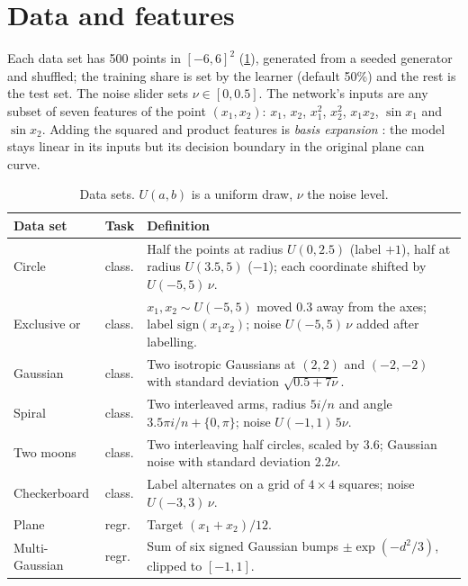 \documentclass[11pt,a4paper]{article}
\begin{document}
\section{Data and features}\label{sec:data}

Each data set has 500 points in $[-6, 6]^2$ (\cref{tab:data}), generated from a seeded generator and shuffled; the training share is set by the learner (default 50\%) and the rest is the test set. The noise slider sets $\nu \in [0, 0.5]$. The network's inputs are any subset of seven features of the point $(x_1, x_2)$: $x_1$, $x_2$, $x_1^2$, $x_2^2$, $x_1x_2$, $\sin x_1$ and $\sin x_2$. Adding the squared and product features is \emph{basis expansion} \citep[chap.~5]{hastie2009esl}: the model stays linear in its inputs but its decision boundary in the original plane can curve.

\begin{table}[!htbp]
\centering\small
\caption{Data sets. $U(a,b)$ is a uniform draw, $\nu$ the noise level.}\label{tab:data}
\begin{tabularx}{\textwidth}{l l >{\raggedright\arraybackslash}X}
\toprule
Data set & Task & Definition \\
\midrule
Circle & class. & Half the points at radius $U(0, 2.5)$ (label $+1$), half at radius $U(3.5, 5)$ ($-1$); each coordinate shifted by $U(-5,5)\,\nu$. \\
Exclusive or & class. & $x_1, x_2 \sim U(-5,5)$ moved $0.3$ away from the axes; label $\mathrm{sign}(x_1x_2)$; noise $U(-5,5)\,\nu$ added after labelling. \\
Gaussian & class. & Two isotropic Gaussians at $(2,2)$ and $(-2,-2)$ with standard deviation $\sqrt{0.5 + 7\nu}$. \\
Spiral & class. & Two interleaved arms, radius $5i/n$ and angle $3.5\pi i/n + \{0, \pi\}$; noise $U(-1,1)\,5\nu$. \\
Two moons & class. & Two interleaving half circles, scaled by $3.6$; Gaussian noise with standard deviation $2.2\nu$. \\
Checkerboard & class. & Label alternates on a grid of $4 \times 4$ squares; noise $U(-3,3)\,\nu$. \\
Plane & regr. & Target $(x_1 + x_2)/12$. \\
Multi-Gaussian & regr. & Sum of six signed Gaussian bumps $\pm\exp(-d^2/3)$, clipped to $[-1, 1]$. \\
\bottomrule
\end{tabularx}
\end{table}
\end{document}
